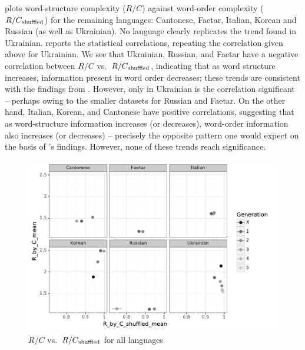 \documentclass[output=paper]{langscibook}
\begin{document}
 plots word-structure complexity ($R/C$) against word-order complexity ($R/C\textsubscript{shuffled}$) for the remaining languages: Cantonese, Faetar, Italian, Korean and Russian (as well as Ukrainian). No language clearly replicates the trend found in Ukrainian. 
 reports the statistical correlations, repeating the correlation given above for Ukrainian. We see that Ukrainian, Russian, and Faetar have a negative correlation between $R/C$  vs.~$R/C\textsubscript{shuffled}$, indicating that as word structure increases, information present in word order decreases; these trends are consistent with the findings from \citet{koplenig2017statistical}. However, only in Ukrainian is the correlation significant -- perhaps owing to the smaller datasets for Russian and Faetar.  On the other hand, Italian, Korean, and Cantonese have positive correlations, suggesting that as word-structure information increases (or decreases), word-order information also increases (or decreases) -- precisely the opposite pattern one would expect on the basis of \citeauthor{koplenig2017statistical}'s findings. However, none of these trends reach significance.

\begin{figure}
\includegraphics[width=\linewidth]{figures/ggplot_FW_all.pdf}
\caption{%
        $R/C$  vs.~$R/C\textsubscript{shuffled}$ for all languages}%
\label{fig:other-languages-r/c}
\end{figure}
\end{document}
